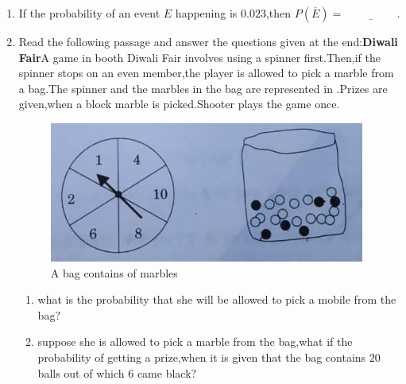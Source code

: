 \begin{enumerate}
\item If the probability of an event $E$ happening is $0.023$,then $P(\overline{E})=\underline{\hspace{2cm}}$.
\item Read the following passage and answer the questions given at the end:\newline\textbf{Diwali Fair}\newline A game in booth Diwali Fair involves using a spinner first.Then,if the spinner stops on an even member,the player is allowed to pick a marble from a bag.The spinner and the marbles in the bag are represented in .\newline Prizes are given,when a block marble is picked.Shooter plays the game once.
\begin{figure}[H]
\centering
\includegraphics[width=\columnwidth]{figs/PROB.PNG}
\caption{A bag contains of marbles}
\label{fig:PROB.PNG}
\end{figure}
\begin{enumerate}[label=(\roman*)]
\item what is the probability that she will be allowed to pick a mobile from the bag$?$
\item suppose she is allowed to pick a marble from the bag,what if the probability of getting a prize,when it is given that the bag contains $20$ balls out of which $6$ came black$?$
\end{enumerate}
\end{enumerate}
